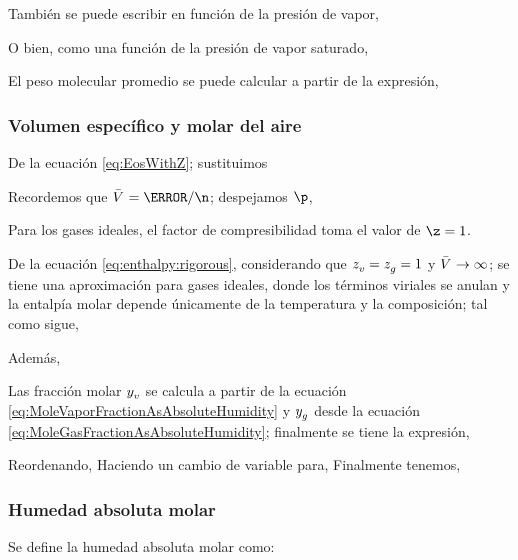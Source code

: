     También se puede escribir en función de la presión de vapor,
    \eqMixSimplAbsoluteHumidityAsPtotal

    O bien, como una función de la presión de vapor saturado,
    \eqMixSimplAbsoluteHumidityAsPtotalAndPressureSaturated


    El peso molecular promedio se puede calcular a partir de la expresión,
    \eqMolecularWeightAverage

    
\subsubsection{Volumen específico y molar del aire}
    De la ecuación \eqref{eq:EosWithZ}; sustituimos 
    \eqEosWithMolarVolumeZ*
    
    Recordemos que $\molarVolume = \V / \n$; despejamos $\p$,
    \eqEosPressureWithMolarVolumeZ*
    
    Para los gases ideales, el factor de compresibilidad toma el valor de $\z = 1$.

    \eqEnthalpyRigorous

    De la ecuación \eqref{eq:enthalpy:rigorous}, considerando que ${z}_{\text{\ensuremath{{v}}}}^{} = {z}_{\text{\ensuremath{{g}}}}^{} = 1$ y  $\molarVolume \to \infty$; se tiene una aproximación para gases ideales, donde los términos viriales se anulan y la entalpía molar depende únicamente de la temperatura y la composición; tal como sigue,
    
    \eqEnthalpyIdealMolar
    
    Además,
    \eqEnthalpyConversion
    
    Las fracción molar ${y}_{\text{\ensuremath{{v}}}}^{}$ se calcula a partir de la ecuación \eqref{eq:MoleVaporFractionAsAbsoluteHumidity} y ${y}_{\text{\ensuremath{{g}}}}^{}$ desde la ecuación \eqref{eq:MoleGasFractionAsAbsoluteHumidity}; finalmente se tiene la expresión,
    
    
    \eqEnthalpyExpanded*
    Reordenando,
    \eqEnthalpyExpandedDevelop*
    Haciendo un cambio de variable para,
    \eqCpHumid*
    Finalmente tenemos,
    \eqEnthalpyCompact*
    
\subsubsection{Humedad absoluta molar}
    Se define la humedad absoluta molar como:
    \eqnMolarAbsoluteHumidity 